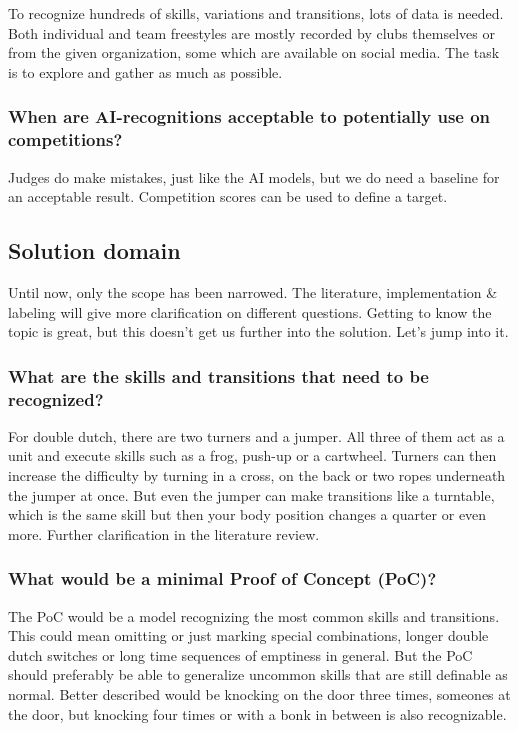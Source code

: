 To recognize hundreds of skills, variations and transitions, lots of data is needed. Both individual and team freestyles are mostly recorded by clubs themselves or from the given organization, some which are available on social media. The task is to explore and gather as much as possible. 

\subsubsection{When are AI-recognitions acceptable to potentially use on competitions?}

Judges do make mistakes, just like the AI models, but we do need a baseline for an acceptable result. Competition scores can be used to define a target.


\subsection{Solution domain}

Until now, only the scope has been narrowed. The literature, implementation \& labeling will give more clarification on different questions. Getting to know the topic is great, but this doesn't get us further into the solution. Let's jump into it.

\subsubsection{What are the skills and transitions that need to be recognized?}
For double dutch, there are two turners and a jumper. All three of them act as a unit and execute skills such as a frog, push-up or a cartwheel. Turners can then increase the difficulty by turning in a cross, on the back or two ropes underneath the jumper at once. But even the jumper can make transitions like a turntable, which is the same skill but then your body position changes a quarter or even more. Further clarification in the literature review.

\subsubsection{What would be a minimal Proof of Concept (PoC)?}

The PoC would be a model recognizing the most common skills and transitions.
This could mean omitting or just marking special combinations, longer double dutch switches or long time sequences of emptiness in general. But the PoC should preferably be able to generalize uncommon skills that are still definable as normal. Better described would be knocking on the door three times, someones at the door, but knocking four times or with a bonk in between is also recognizable.

